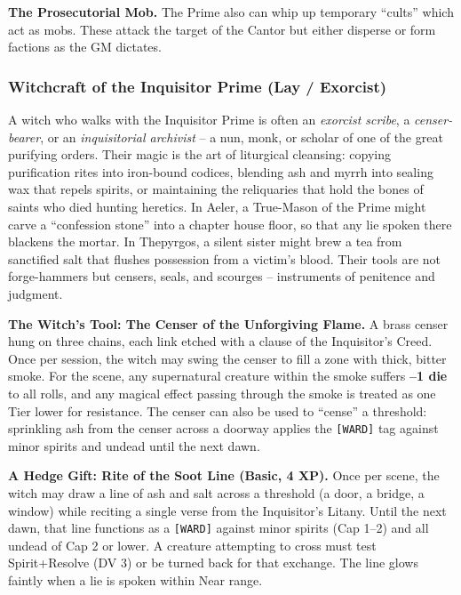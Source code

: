 \textbf{The Prosecutorial Mob.} The Prime also can whip up temporary ``cults'' which act as mobs. These attack the target of the Cantor but either disperse or form factions as the GM dictates.

\subsubsection*{Witchcraft of the Inquisitor Prime (Lay / Exorcist)}

A witch who walks with the Inquisitor Prime is often an \textit{exorcist scribe}, a \textit{censer-bearer}, or an \textit{inquisitorial archivist} -- a nun, monk, or scholar of one of the great purifying orders. Their magic is the art of liturgical cleansing: copying purification rites into iron-bound codices, blending ash and myrrh into sealing wax that repels spirits, or maintaining the reliquaries that hold the bones of saints who died hunting heretics. In Aeler, a True-Mason of the Prime might carve a ``confession stone'' into a chapter house floor, so that any lie spoken there blackens the mortar. In Thepyrgos, a silent sister might brew a tea from sanctified salt that flushes possession from a victim's blood. Their tools are not forge-hammers but censers, seals, and scourges -- instruments of penitence and judgment.

\textbf{The Witch's Tool: The Censer of the Unforgiving Flame.} A brass censer hung on three chains, each link etched with a clause of the Inquisitor's Creed. Once per session, the witch may swing the censer to fill a zone with thick, bitter smoke. For the scene, any supernatural creature within the smoke suffers \textbf{--1 die} to all rolls, and any magical effect passing through the smoke is treated as one Tier lower for resistance. The censer can also be used to ``cense'' a threshold: sprinkling ash from the censer across a doorway applies the \texttt{[WARD]} tag against minor spirits and undead until the next dawn.

\textbf{A Hedge Gift: Rite of the Soot Line (Basic, 4 XP).} Once per scene, the witch may draw a line of ash and salt across a threshold (a door, a bridge, a window) while reciting a single verse from the Inquisitor's Litany. Until the next dawn, that line functions as a \texttt{[WARD]} against minor spirits (Cap 1--2) and all undead of Cap 2 or lower. A creature attempting to cross must test Spirit+Resolve (DV 3) or be turned back for that exchange. The line glows faintly when a lie is spoken within Near range.

